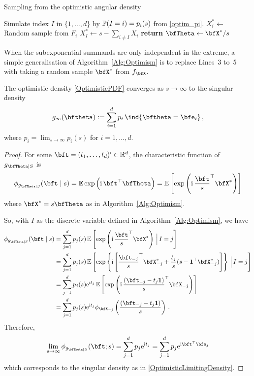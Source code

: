 \begin{algorithm}[H]
\caption{Sampling from the optimistic angular density}\label{Alg:Optimism}
\begin{algorithmic}[1]
\State Simulate index $I$ in $\{1, \dots, d\}$ by $\operatorname{{\mathbb P}}(I=i) = p_i(s)$ from \eqref{optim_pi}.
\State $X_i^* \gets$ Random sample from $F_i$
\EndFor
\State $X_I^* \gets s - \sum_{i \not= I} X_i$ 
\State \textbf{return} $\bfTheta \gets \bfX^* / s$
\EndProcedure
\end{algorithmic}
\end{algorithm}

When the subexponential summands are only independent in the extreme, a simple
generalisation of Algorithm~\ref{Alg:Optimism} is to replace Lines~3 to~5 with
taking a random sample $\bfX^*$ from $f_{\bfX}$.

\begin{proposition} \label{prop:optimistic_asymptotic}

The optimistic density \eqref{OptimisticPDF} converges as $s \to \infty$ to the singular density
\begin{equation} \label{OptimisticLimitingDensity}
g_\infty(\bftheta) := \sum_{i=1}^{d} p_i \, \ind { \bftheta = \bfe_i } \,,
\end{equation}
where $p_i = \lim_{s\to\infty} p_i(s)$ for $i=1,\dots,d$.
\end{proposition}

\begin{proof}
For some $\bft=(t_1,\dots,t_d)' \in \mathbb{R}^d$, the characteristic function of $g_{\bfTheta \mid  S}$ is
\[
\phi_{g_{\bfTheta \mid  S}}(\bft \mid s)
= \Exp \exp\left(\ih\,\bft^\top \bfTheta \right)
= \Exp \left[ \exp\left(\ih\,\frac{\bft}{s}^\top \bfX^* \right) \right]
\]
where $\bfX^* = s \bfTheta$ as in Algorithm~\ref{Alg:Optimism}.

So, with $I$ as the discrete variable defined in Algorithm~\ref{Alg:Optimism}, we have
\begin{align*}
\phi_{g_{\bfTheta \mid  S}}(\bft \mid s)
&= \sum_{j=1}^d p_j(s) \Exp \left[ \exp\left(\ih\,\frac{\bft}{s}^\top \bfX^* \right) \,\Big|\, I = j \right] \\
&= \sum_{j=1}^d p_j(s) \Exp \left[ \exp \left\{ \ih \left[ \frac{\bft_{-j}}{s}^\top \bfX^*_{-j} + \frac{t_j}{s} (s - \bfone^\top \bfX^*_{-j}) \right] \right\}  \,\Big|\, I = j \right] \\
&= \sum_{j=1}^d p_j(s) \e^{\ih t_j} \Exp \left[ \exp\left(\ih\,\frac{(\bft_{-j} - t_j \bfone)}{s}^\top \bfX_{-j} \right)  \right] \\
&= \sum_{j=1}^d p_j(s) \e^{\ih t_j} \phi_{\bfX_{-j}} \left(  \frac{(\bft_{-j} - t_j \bfone)}{s} \right) \,.
\end{align*}
Therefore,
\[
\lim_{s \to \infty} \phi_{g_{\bfTheta | S}}(\bft ; s)
= \sum_{j=1}^d p_j \e^{\ih t_j}
= \sum_{j=1}^d p_j \e^{\ih \bft^\top \bfe_j}
\]
which corresponds to the singular density as in \eqref{OptimisticLimitingDensity}.
\end{proof}

